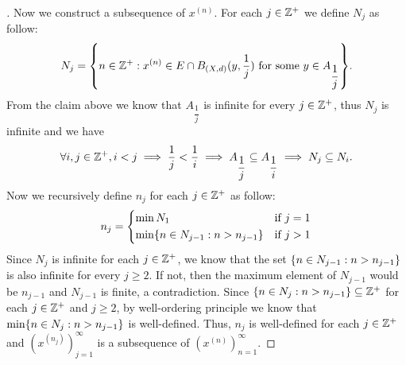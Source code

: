 \begin{proof}[]
  Now we construct a subsequence of \(x^{(n)}\).
  For each \(j \in \mathbb{Z}^+\) we define \(N_j\) as follow:
  \[
    N_j = \set{n \in \Z^+ : x^{(n)} \in E \cap B_{(X, d)}(y, \dfrac{1}{j}) \text{ for some } y \in A_{\dfrac{1}{j}}}.
  \]
  From the claim above we know that \(A_{\dfrac{1}{j}}\) is infinite for every \(j \in \mathbb{Z}^+\), thus \(N_j\) is infinite and we have
  \[
    \forall i, j \in \mathbb{Z}^+, i < j \implies \dfrac{1}{j} < \dfrac{1}{i} \implies A_{\dfrac{1}{j}} \subseteq A_{\dfrac{1}{i}} \implies N_j \subseteq N_i.
  \]
  Now we recursively define \(n_j\) for each \(j \in \mathbb{Z}^+\) as follow:
  \[
    n_j = \begin{dcases}
      \min N_1                                  & \text{if } j = 1 \\
      \min\set{n \in N_{j - 1} : n > n_{j - 1}} & \text{if } j > 1
    \end{dcases}
  \]
  Since \(N_j\) is infinite for each \(j \in \mathbb{Z}^+\), we know that the set \(\left\lbrace n \in N_{j - 1} : n > n_{j - 1}\right\rbrace\) is also infinite for every \(j \geq 2\).
  If not, then the maximum element of \(N_{j - 1}\) would be \(n_{j - 1}\) and \(N_{j - 1}\) is finite, a contradiction.
  Since \(\left\lbrace n \in N_j : n > n_{j - 1}\right\rbrace \subseteq \mathbb{Z}^+\) for each \(j \in \mathbb{Z}^+\) and \(j \geq 2\), by well-ordering principle we know that \(\min\set{n \in N_j : n > n_{j - 1}}\) is well-defined.
  Thus, \(n_j\) is well-defined for each \(j \in \mathbb{Z}^+\) and \((x^{(n_j)})_{j = 1}^\infty\) is a subsequence of \((x^{(n)})_{n = 1}^\infty\).


\end{proof}
